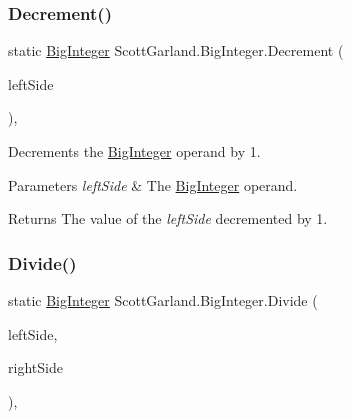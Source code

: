 \subsubsection{\texorpdfstring{Decrement()}{Decrement()}}
{\footnotesize\ttfamily static \hyperlink{class_scott_garland_1_1_big_integer}{Big\+Integer} Scott\+Garland.\+Big\+Integer.\+Decrement (\begin{DoxyParamCaption}\item[{\hyperlink{class_scott_garland_1_1_big_integer}{Big\+Integer}}]{left\+Side }\end{DoxyParamCaption})\hspace{0.3cm}{\ttfamily [inline]}, {\ttfamily [static]}}



Decrements the \hyperlink{class_scott_garland_1_1_big_integer}{Big\+Integer} operand by 1. 


\begin{DoxyParams}{Parameters}
{\em left\+Side} & The \hyperlink{class_scott_garland_1_1_big_integer}{Big\+Integer} operand.\\
\hline
\end{DoxyParams}
\begin{DoxyReturn}{Returns}
The value of the {\itshape left\+Side}  decremented by 1.
\end{DoxyReturn}
\mbox{\label{class_scott_garland_1_1_big_integer_a98eadd02148a503be9ca7fb7929224da}} 
\subsubsection{\texorpdfstring{Divide()}{Divide()}}
{\footnotesize\ttfamily static \hyperlink{class_scott_garland_1_1_big_integer}{Big\+Integer} Scott\+Garland.\+Big\+Integer.\+Divide (\begin{DoxyParamCaption}\item[{\hyperlink{class_scott_garland_1_1_big_integer}{Big\+Integer}}]{left\+Side,  }\item[{\hyperlink{class_scott_garland_1_1_big_integer}{Big\+Integer}}]{right\+Side }\end{DoxyParamCaption})\hspace{0.3cm}{\ttfamily [inline]}, {\ttfamily [static]}}



